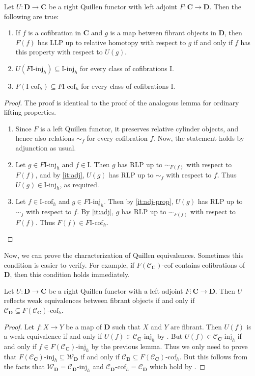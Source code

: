 \documentclass{tac}
\theoremstyle{definition}
\newcommand{\we}{\mathcal{W}}
\newcommand{\cof}{\mathcal{C}}
\newcommand{\cat}[1]{\mathbf{#1}}
\newcommand{\C}{\cat{C}}
\newcommand{\D}{\cat{D}}
\newcommand{\I}{\mathrm{I}}
\newcommand{\class}[2]{#1\text{-}\mathrm{#2}}
\newcommand{\Iinj}[1][\I]{\class{#1}{inj}}
\newcommand{\Icof}[1][\I]{\class{#1}{cof}}
\begin{document}
\begin{lem}
Let $U : \D \to \C$ be a right Quillen functor with left adjoint $F : \C \to \D$.
Then the following are true:
\begin{enumerate}
\item \label{it:adj} If $f$ is a cofibration in $\C$ and $g$ is a map between fibrant objects in $\D$,
then $F(f)$ has LLP up to relative homotopy with respect to $g$ if and only if $f$ has this property with respect to $U(g)$.
\item \label{it:adj-prop} $U(\Iinj[F\I]_h) \subseteq \Iinj_h$ for every class of cofibrations $\I$.
\item $F(\Icof_h) \subseteq \Icof[F\I]_h$ for every class of cofibrations $\I$.
\end{enumerate}
\end{lem}
\begin{proof}
The proof is identical to the proof of the analogous lemma for ordinary lifting properties.
\begin{enumerate}
\item Since $F$ is a left Quillen functor, it preserves relative cylinder objects, and hence also relations $\sim_f$ for every cofibration $f$.
Now, the statement holds by adjunction as usual.
\item Let $g \in \Iinj[F\I]_h$ and $f \in \I$.
Then $g$ has RLP up to $\sim_{F(f)}$ with respect to $F(f)$, and by \eqref{it:adj}, $U(g)$ has RLP up to $\sim_f$ with respect to $f$.
Thus $U(g) \in \Iinj_h$, as required.
\item Let $f \in \Icof_h$ and $g \in \Iinj[F\I]_h$.
Then by \eqref{it:adj-prop}, $U(g)$ has RLP up to $\sim_f$ with respect to $f$.
By \eqref{it:adj}, $g$ has RLP up to $\sim_{F(f)}$ with respect to $F(f)$.
Thus $F(f) \in \Icof[F\I]_h$.
\end{enumerate}
\end{proof}

Now, we can prove the characterization of Quillen equivalences.
Sometimes this condition is easier to verify.
For example, if $\Icof[F(\cof_\C)]$ contains cofibrations of $\D$, then this condition holds immediately.

\begin{prop}
Let $U : \D \to \C$ be a right Quillen functor with a left adjoint $F : \C \to \D$.
Then $U$ reflects weak equivalences between fibrant objects if and only if $\cof_\D \subseteq \Icof[F(\cof_\C)]_h$.
\end{prop}
\begin{proof}
Let $f : X \to Y$ be a map of $\D$ such that $X$ and $Y$ are fibrant.
Then $U(f)$ is a weak equivalence if and only if $U(f) \in \Iinj[\cof_\C]_h$ by .
But $U(f) \in \Iinj[\cof_\C]_h$ if and only if $f \in \Iinj[F(\cof_\C)]_h$ by the previous lemma.
Thus we only need to prove that $\Iinj[F(\cof_\C)]_h \subseteq \we_\D$ if and only if $\cof_\D \subseteq \Icof[F(\cof_\C)]_h$.
But this follows from the facts that $\we_\D = \Iinj[\cof_\D]_h$ and $\Icof[\cof_\D]_h = \cof_\D$ which hold by .
\end{proof}
\end{document}

